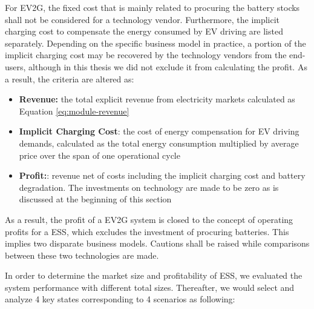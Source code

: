 For EV2G, the fixed cost that is mainly related to procuring the battery stocks shall not be considered for a technology vendor. Furthermore, the implicit charging cost to compensate the energy consumed by EV driving are listed separately. Depending on the specific business model in practice, a portion of the implicit charging cost may be recovered by the technology vendors from the end-users, although in this thesis we did not exclude it from calculating the profit. As a result, the criteria are altered as:
\begin{itemize}
	\item \textbf{Revenue:} the total explicit revenue from electricity markets calculated as Equation \eqref{eq:module-revenue}
	\item \textbf{Implicit Charging Cost}: the cost of energy compensation for EV driving demands, calculated as the total energy consumption multiplied by average price over the span of one operational cycle
	\item \textbf{Profit:}: revenue net of costs including the implicit charging cost and battery degradation. The investments on technology are made to be zero as is discussed at the beginning of this section
\end{itemize}

As a result, the profit of a EV2G system is closed to the concept of operating profits for a ESS, which excludes the investment of procuring batteries. This implies two disparate business models. Cautions shall be raised while comparisons between these two technologies are made.

In order to determine the market size and profitability of ESS, we evaluated the system performance with different total sizes. Thereafter, we would select and analyze 4 key states corresponding to 4 scenarios as following:

